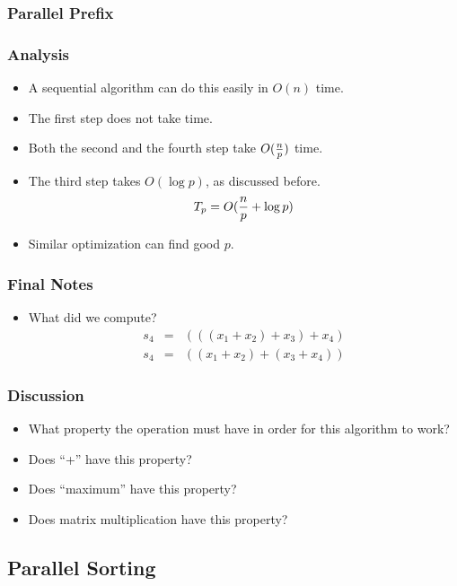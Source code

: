 \documentclass{beamer}
\begin{document}
\begin{CJK}{UTF8}{bsmi}
\begin{frame}
\frametitle{Parallel Prefix}
\centerline{}
\end{frame}

\begin{frame}
\frametitle{Analysis}
\begin{itemize}
\item A sequential algorithm can do this easily in $O(n)$ time.
\item The first step does not take time.
\item Both the second and the fourth step take $O({n \over p})$ time.
\item The third step takes $O(\log p)$, as discussed before.
\begin{equation}
T_p = O({n \over p} + \log p)
\end{equation}
\item Similar optimization can find good $p$.
\end{itemize}
\end{frame}

\begin{frame}
\frametitle{Final Notes}
\begin{itemize}
\item What did we compute?
\begin{eqnarray}
s_4 & = & (((x_1 + x_2) + x_3) + x_4) \\
s_4 & = & ((x_1 + x_2) + (x_3 + x_4))
\end{eqnarray}
\end{itemize}
\end{frame}

\begin{frame}
\frametitle{Discussion}
\begin{itemize}
\item What property the operation must have in order for this
  algorithm to work?
\item Does ``+'' have this property?
\item Does ``maximum'' have this property?
\item Does matrix multiplication have this property?
\end{itemize}
\end{frame}

\subsection{Parallel Sorting}


\end{CJK}
\end{document}
